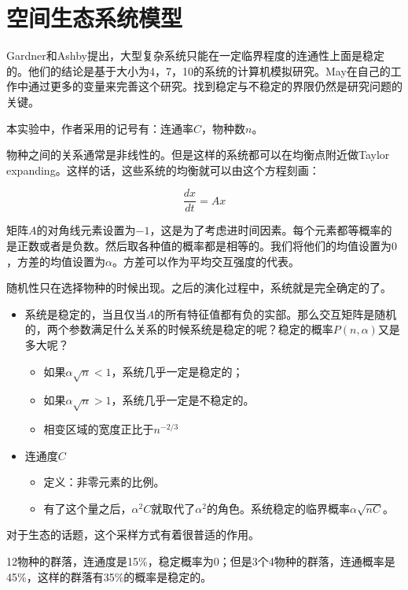 \chapter{空间生态系统模型}

Gardner和Ashby提出，大型复杂系统只能在一定临界程度的连通性上面是稳定的。他们的结论是基于大小为4，7，10的系统的计算机模拟研究。May在自己的工作中通过更多的变量来完善这个研究。找到稳定与不稳定的界限仍然是研究问题的关键。

本实验中，作者采用的记号有：连通率\(C\)，物种数\(n\)。

物种之间的关系通常是非线性的。但是这样的系统都可以在均衡点附近做Taylor
expanding。这样的话，这些系统的均衡就可以由这个方程刻画：

\[\frac{dx}{dt} = Ax\]

矩阵\(A\)的对角线元素设置为\(-1\)，这是为了考虑进时间因素。每个元素都等概率的是正数或者是负数。然后取各种值的概率都是相等的。我们将他们的均值设置为\(0\)，方差的均值设置为\(\alpha\)。方差可以作为平均交互强度的代表。

随机性只在选择物种的时候出现。之后的演化过程中，系统就是完全确定的了。

\begin{itemize}
\item
  系统是稳定的，当且仅当\(A\)的所有特征值都有负的实部。那么交互矩阵是随机的，两个参数满足什么关系的时候系统是稳定的呢？稳定的概率\(P(n,\alpha)\)又是多大呢？

  \begin{itemize}
  \item
    如果\(\alpha\sqrt{n}<1\)，系统几乎一定是稳定的；
  \item
    如果\(\alpha\sqrt{n}>1\)，系统几乎一定是不稳定的。
  \item
    相变区域的宽度正比于\(n^{-2/3}\)
  \end{itemize}
\item
  连通度\(C\)

  \begin{itemize}
  \item
    定义：非零元素的比例。
  \item
    有了这个量之后，\(\alpha^2C\)就取代了\(\alpha^2\)的角色。系统稳定的临界概率\(\alpha\sqrt{nC}\)。
  \end{itemize}
\end{itemize}

对于生态的话题，这个采样方式有着很普适的作用。

12物种的群落，连通度是15\%，稳定概率为0；但是3个4物种的群落，连通概率是45\%，这样的群落有35\%的概率是稳定的。

